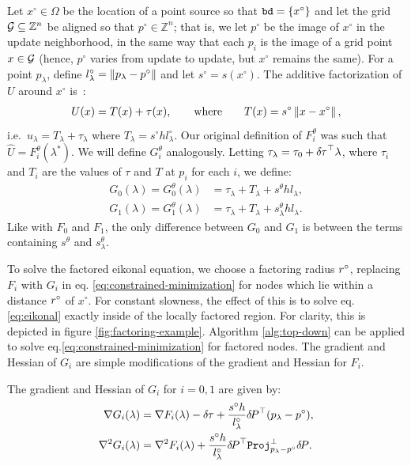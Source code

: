 \documentclass[smallcondensed]{svjour3}
\begin{document}
Let $x^\circ \in \Omega$ be the location of a point source so that
$\texttt{bd} = \left\{x^\circ\right\}$ and let the grid
$\mathcal{G} \subseteq \mathbb{Z}^n$ be aligned so that
$p^\circ \in \mathbb{Z}^n$; that is, we let $p^\circ$ be the image of
$x^\circ$ in the update neighborhood, in the same way that each $p_i$
is the image of a grid point $x \in \mathcal{G}$ (hence, $p^\circ$ varies
from update to update, but $x^\circ$ remains the same). For a point
$p_\lambda$, define $l^\circ_\lambda = \left\|p_\lambda - p^\circ\right\|$ and
let $s^\circ = s(x^\circ)$. The additive factorization of $U$ around
$x^\circ$ is~\cite{luo2012fast,qi2018corner}:
\begin{align}
  U(x) = T(x) + \tau(x), \qquad \text{where} \qquad T(x) = s^\circ \left\|x - x^\circ\right\|,
\end{align}
i.e.\ $u_\lambda = T_\lambda + \tau_\lambda$ where
$T_\lambda = s^\circ h l^\circ_\lambda$. Our original definition of
$F_i^\theta$ was such that $\hat{U} = F_i^\theta(\lambda^*)$. We will
define $G_i^\theta$ analogously. Letting
$\tau_\lambda = \tau_0 + {\delta \hspace{-0.05em} \tau}^\top \lambda$, where $\tau_i$ and
$T_i$ are the values of $\tau$ and $T$ at $p_i$ for each $i$, we
define:
\begin{align}
  \label{eq:Gi}
  G_0(\lambda) = G_0^\theta(\lambda) &= \tau_\lambda + T_\lambda + s^\theta h l_\lambda, \\
  G_1(\lambda) = G_1^\theta(\lambda) &= \tau_\lambda + T_\lambda + s^\theta_\lambda h l_\lambda.
\end{align}
Like with $F_0$ and $F_1$, the only difference between
$G_0$ and $G_1$ is between the terms containing
$s^\theta$ and $s^\theta_\lambda$.

To solve the factored eikonal equation, we choose a factoring radius
$r^\circ$, replacing $F_i$ with $G_i$ in eq.\@
\ref{eq:constrained-minimization} for nodes which lie within a
distance $r^\circ$ of $x^\circ$. For constant slowness, the effect of
this is to solve eq.\@ \ref{eq:eikonal} exactly inside of the
locally factored region. For clarity, this is depicted in figure
\ref{fig:factoring-example}. Algorithm \ref{alg:top-down} can be
applied to solve eq.\@ \ref{eq:constrained-minimization} for
factored nodes. The gradient and Hessian of $G_i$ are simple
modifications of the gradient and Hessian for $F_i$.

\begin{lemma}
  The gradient and Hessian of $G_i$ for $i = 0, 1$ are given
  by:
  \begin{align}
    \label{eq:G-grad-hess}
    \nabla G_i(\lambda) &= \nabla F_i(\lambda) - {\delta \hspace{-0.05em} \tau} + \frac{s^\circ h}{l^\circ_\lambda} {\delta \hspace{-0.14em} P}^\top {(p_\lambda - p^\circ)}, \\
    \nabla^2 G_i(\lambda) &= \nabla^2 F_i(\lambda) + \frac{s^\circ h}{l^\circ_\lambda} {\delta \hspace{-0.14em} P}^\top \mathtt{Proj}^\perp_{p_\lambda - p^\circ} {\delta \hspace{-0.14em} P}.
  \end{align}
\end{lemma}
\end{document}
